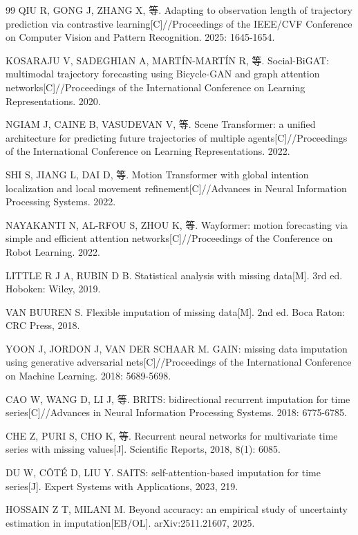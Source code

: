 \begin{thebibliography}{99}
QIU R, GONG J, ZHANG X, 等. Adapting to observation length of trajectory prediction via contrastive learning[C]//Proceedings of the IEEE/CVF Conference on Computer Vision and Pattern Recognition. 2025: 1645-1654.

KOSARAJU V, SADEGHIAN A, MARTÍN-MARTÍN R, 等. Social-BiGAT: multimodal trajectory forecasting using Bicycle-GAN and graph attention networks[C]//Proceedings of the International Conference on Learning Representations. 2020.

NGIAM J, CAINE B, VASUDEVAN V, 等. Scene Transformer: a unified architecture for predicting future trajectories of multiple agents[C]//Proceedings of the International Conference on Learning Representations. 2022.

SHI S, JIANG L, DAI D, 等. Motion Transformer with global intention localization and local movement refinement[C]//Advances in Neural Information Processing Systems. 2022.

NAYAKANTI N, AL-RFOU S, ZHOU K, 等. Wayformer: motion forecasting via simple and efficient attention networks[C]//Proceedings of the Conference on Robot Learning. 2022.

LITTLE R J A, RUBIN D B. Statistical analysis with missing data[M]. 3rd ed. Hoboken: Wiley, 2019.

VAN BUUREN S. Flexible imputation of missing data[M]. 2nd ed. Boca Raton: CRC Press, 2018.

YOON J, JORDON J, VAN DER SCHAAR M. GAIN: missing data imputation using generative adversarial nets[C]//Proceedings of the International Conference on Machine Learning. 2018: 5689-5698.

CAO W, WANG D, LI J, 等. BRITS: bidirectional recurrent imputation for time series[C]//Advances in Neural Information Processing Systems. 2018: 6775-6785.

CHE Z, PURI S, CHO K, 等. Recurrent neural networks for multivariate time series with missing values[J]. Scientific Reports, 2018, 8(1): 6085.

DU W, CÔTÉ D, LIU Y. SAITS: self-attention-based imputation for time series[J]. Expert Systems with Applications, 2023, 219.

HOSSAIN Z T, MILANI M. Beyond accuracy: an empirical study of uncertainty estimation in imputation[EB/OL]. arXiv:2511.21607, 2025.


\end{thebibliography}
